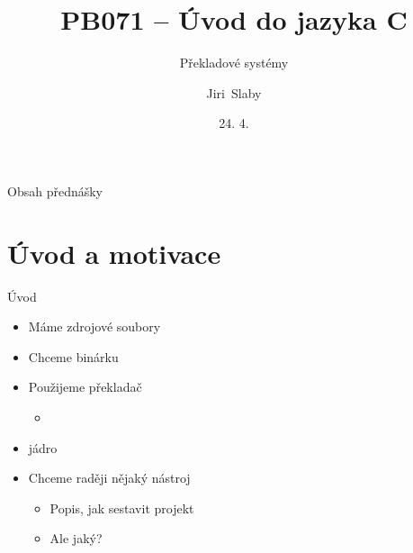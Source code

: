 


\usepackage[czech]{babel}



\newcommand{\make}{\texttt{make}\xspace}
\newcommand{\cmake}{\texttt{cmake}\xspace}

\title[PB071 -- Překlad]{PB071 -- Úvod do jazyka C}

\author{Jiri~Slaby}


\subtitle{Překladové systémy}
\date{24. 4. \the\year}



\begin{frame}
  \titlepage
\end{frame}

\begin{frame}{Obsah přednášky}
  \tableofcontents
\end{frame}


\section{Úvod a motivace}
\frame{\sectionpage}

\begin{frame}{Úvod}

  \begin{itemize}
    \item Máme zdrojové soubory

    \pause

    \item Chceme binárku

    \pause

    \item Použijeme překladač
    \begin{itemize}
      \item {}
    \end{itemize}

    \pause

    \item {} jádro

    \pause

    \item Chceme raději nějaký nástroj
    \begin{itemize}
      \item Popis, jak sestavit projekt

      \pause

      \item Ale jaký?
    \end{itemize}

  \end{itemize}

\end{frame}

